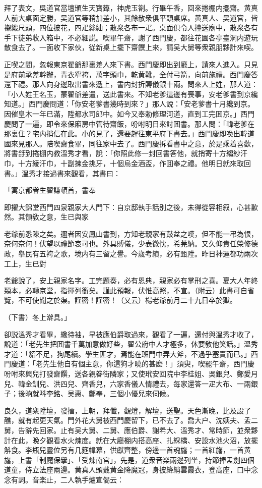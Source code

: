 拜了表文，吳道官當壇頒生天寳籙，神虎玉劄。行畢午香，回來捲棚内擺齋。黄真人前大桌面定勝，吴道官等稍加差小，其餘散衆俱平頭桌席。黄真人、吴道官，皆襯緞尺頭，四位披花，四疋絲紬；散衆各布一疋。桌面俱令人擡送廟中，散衆各有手下徒弟收入箱中，不必細説。喫畢午齋，謝了西門慶，都往花園各亭臺洞内遊玩散食去了。一面收下家伙，従新桌上擺下齋饌上來，請吴大舅等衆親朋夥計來喫。

正喫之間，忽報東京翟爺那裏差人來下書。西門慶即出到廳上，請來人進入。只見是府前承差幹辦，青衣窄袴，萬字頭巾，乾黄靴，全付弓箭，向前施禮。西門慶答還下禮。那人向身邊取出書來遞上，書内封折賻儀銀十兩。問來人上姓，那人道：「小人姓王名玉，蒙翟爺差遣，送此書來。不知老爹這邊有喪事，安老爹書到京纔知道。」西門慶問道：「你安老爹書幾時到來？」那人說：「安老爹書十月纔到京。因催皇木一年已滿，陞都水司郎中。如今又奉勅修理河道，直到工完囬京。」西門慶問了一遍，即令來保廂房中管待齋飯，吩咐明日來討囬書。那人問：「韓老爹在那裏住？宅内捎信在此。小的見了，還要趕往東平府下書去。」西門慶即喚出韓道國來見那人。陪喫齋食畢，同往家中去了。西門慶拆看書中之意，於是乘着喜歡，將書㧱到捲棚内教溫秀才看，說：「你照此修一封回書答他，就捎寄十方縐紗汗巾，十方綾汗巾，十副揀金挑牙，十個烏金酒盃，作囬奉之禮。他明日就來取回書。」溫秀才接過書來觀看，其書曰：

「寓京都眷生翟謙頓首，書奉

即擢大錦堂西門四泉親家大人門下：自京邸執手話别之後，未得從容相叙，心甚歉然。其領敎之意，生已與家

老爺前悉陳之矣。邇者因安鳳山書到，方知老親家有鼓盆之嘆，但不能一弔為恨，奈何奈何！伏望以禮節哀可也。外具賻儀，少表微忱，希莞納。又久仰貴任榮修德政，擧民有五袴之歌，境内有三留之譽。今歲考績，必有甄陞。昨日神運都功兩次工上，生已對

老爺說了，安上親家名字。工完題奏，必有恩典，親家必有掌刑之喜。夏大人年終類本，必轉京堂，指揮列銜矣。謹此預報，伏惟高照，不宣。（附云）此書可自省覽，不可使聞之於渠。謹密！謹密！（又云）楊老爺前月二十九日卒於獄。

（下書）冬上澣具。」

卻説溫秀才看畢，纔待袖，早被應伯爵取過來，觀看了一遍，還付與溫秀才收了，說道：「老先生把囬書千萬加意做好些，翟公府中人才極多，休要敎他笑話。」溫秀才道：「貂不足，狗尾續。學生匪才，焉能在班門中弄大斧，不過乎塞責而已。」西門慶道：「老先生他自有個主意，你這狗才曉的甚麽！」須臾，喫罷午齋，西門慶吩咐來興兒打發齋饌，送各親眷街隣家；又使玳安回院中李桂姐、吳銀兒、鄭愛月兒、韓金釧兒、洪四兒、齊香兒，六家香儀人情禮去，每家還答一疋大布、一兩銀子；後晌就呌李銘、吴惠、鄭奉，三個小優兒來伺候。

良久，道衆陞壇，發擂，上朝，拜懺，觀燈，解壇，送聖。天色漸晚，比及設了醮，就有起更天氣。門外花大舅被西門慶留下，已不去了。喬大户、沈姨夫、孟二舅，告辭先回家。止有吴大舅、二舅、應伯爵、謝希大、溫秀才、常時節，並衆夥計在此，晚夕觀看水火煉度。就在大廳棚内搭高座、扎綵橋、安設水池火沼，放擺斛食。李瓶兒靈位另有几筵幃幕，供獻齊整，傍邊一首魂旛；一首紅旛，一首黄旛，上書「制魔保擧」、「受煉南宫」，先是，道衆音楽兩邊列坐，持節捧盂劍四個道童，侍立法座兩邊。黄真人頭戴黄金降魔冠，身披絳綃雲霞衣，登高座，口中念念有詞。音楽止，二人執手爐宣偈云：

